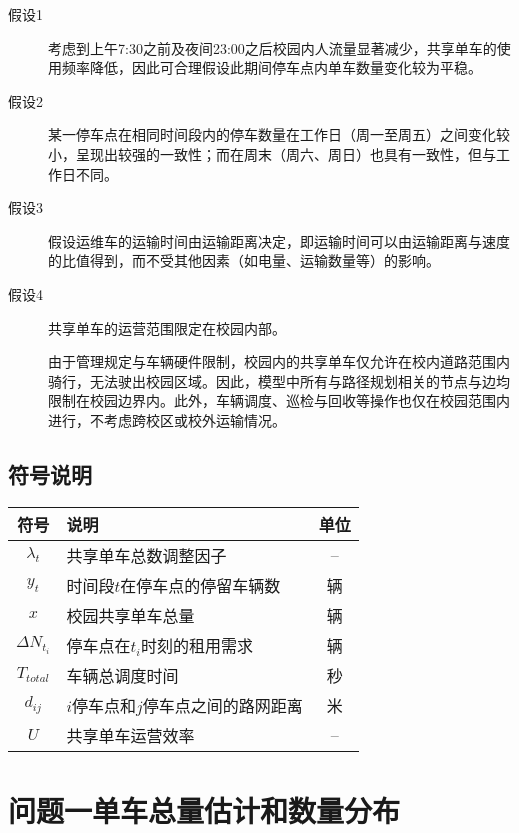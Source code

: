 \documentclass[withoutpreface,bwprint]{cumcmthesis}
\begin{document}
\begin{description}
    \item [假设1] 考虑到上午7:30之前及夜间23:00之后校园内人流量显著减少，共享单车的使用频率降低，因此可合理假设此期间停车点内单车数量变化较为平稳。
    \item [假设2] 某一停车点在相同时间段内的停车数量在工作日（周一至周五）之间变化较小，呈现出较强的一致性；而在周末（周六、周日）也具有一致性，但与工作日不同。
    \item[假设3] 假设运维车的运输时间由运输距离决定，即运输时间可以由运输距离与速度的比值得到，而不受其他因素（如电量、运输数量等）的影响。
    \item[假设4] 共享单车的运营范围限定在校园内部。
    
    由于管理规定与车辆硬件限制，校园内的共享单车仅允许在校内道路范围内骑行，无法驶出校园区域。因此，模型中所有与路径规划相关的节点与边均限制在校园边界内。此外，车辆调度、巡检与回收等操作也仅在校园范围内进行，不考虑跨校区或校外运输情况。 
\end{description}

\subsection{符号说明}

\begin{table}[H]
\centering
\begin{tabularx}{\textwidth}{c >{\centering\arraybackslash}X c}
\toprule
符号 & 说明 & 单位 \\
\midrule
$\lambda_t$ & 共享单车总数调整因子 & -- \\
$y_t$ & 时间段$t$在停车点的停留车辆数 & 辆 \\
$x$ & 校园共享单车总量 & 辆 \\
$\Delta N_{t_i}$ &停车点在$t_i$时刻的租用需求 & 辆\\
$T_{total}$ & 车辆总调度时间 & 秒\\
$d_{ij}$ & $i$停车点和$j$停车点之间的路网距离&米\\
$U$ & 共享单车运营效率 & --\\ 
\bottomrule
\end{tabularx}
\label{tab:symbols}
\end{table}


\section{问题一\hspace{1em}单车总量估计和数量分布}
\end{document}
